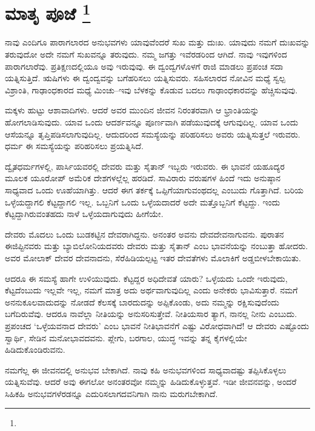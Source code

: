 
\chapter[ಮಾತೃ ಪೂಜೆ ]{ಮಾತೃ ಪೂಜೆ \protect\footnote{}}

ನಾವು ಎಂದಿಗೂ ಪಾರಾಗಲಾರದ ಅನುಭವಗಳು ಯಾವುವೆಂದರೆ ಸುಖ ಮತ್ತು ದುಃಖ. ಯಾವುದು ನಮಗೆ ದುಃಖವನ್ನು ತರುವುದೋ ಅದೇ ನಮಗೆ ಸುಖವನ್ನೂ ತರುವುದು. ನಮ್ಮ ಜಗತ್ತು ಇವೆರಡರಿಂದ ಆಗಿದೆ. ನಾವು ಇವುಗಳಿಂದ ಪಾರಾಗಲಾರೆವು. ಪ್ರತಿಕ್ಷಣದಲ್ಲಿಯೂ ಅವು ಇರುವುವು. ಈ ದ್ವಂದ್ವಗಳೊಳಗೆ ರಾಜಿ ಮಾಡಲು ಪ್ರಪಂಚ ಸದಾ ಯತ್ನಿಸುತ್ತಿದೆ. ಋಷಿಗಳು ಈ ದ್ವಂದ್ವವನ್ನು ಬಗೆಹರಿಸಲು ಯತ್ನಿಸುವರು. ಸಹಿಸಲಾರದ ನೋವಿನ ಮಧ್ಯೆ ಸ್ವಲ್ಪ ವಿಶ್ರಾಂತಿ, ಗಾಢಾಂಧಕಾರದ ಮಧ್ಯೆ ಮಿಂಚು–ಇವು ಬೆಳಕನ್ನು ಕೊಡುವ ಬದಲು ಗಾಢಾಂಧಕಾರವನ್ನು ಹೆಚ್ಚಿಸುವುವು.

ಮಕ್ಕಳು ಹುಟ್ಟು ಆಶಾವಾದಿಗಳು. ಆದರೆ ಅವರ ಮುಂದಿನ ಜೀವನ ನಿರಂತರವಾಗಿ ಆ ಭ್ರಾಂತಿಯನ್ನು ಹೋಗಲಾಡಿಸುವುದು. ಯಾವ ಒಂದು ಆದರ್ಶವನ್ನೂ ಪೂರ್ಣವಾಗಿ ಪಡೆಯುವುದಕ್ಕೆ ಆಗುವುದಿಲ್ಲ. ಯಾವ ಒಂದು ಆಸೆಯನ್ನೂ ತೃಪ್ತಿಪಡಿಸಲಾಗುವುದಿಲ್ಲ. ಆದುದರಿಂದ ಸಮಸ್ಯೆಯನ್ನು ಪರಿಹರಿಸಲು ಅವರು ಯತ್ನಿಸುತ್ತಲೆ ಇರುವರು. ಧರ್ಮ ಈ ಸಮಸ್ಯೆಯನ್ನು ಪರಿಹರಿಸಲು ಪ್ರಯತ್ನಿಸಿದೆ.

ದ್ವೈತಧರ್ಮಗಳಲ್ಲಿ, ಪಾರ್ಸಿಯವರಲ್ಲಿ ದೇವರು ಮತ್ತು ಸೈತಾನ್​ ಇಬ್ಬರು ಇರುವರು. ಈ ಭಾವನೆ ಯಹೂದ್ಯರ ಮೂಲಕ ಯೂರೋಪ್​ ಅಮೆರಿಕ ದೇಶಗಳಲ್ಲೆಲ್ಲ ಹರಡಿದೆ. ಸಾವಿರಾರು ವರುಷಗಳ ಹಿಂದೆ ಇದು ಅನುಷ್ಠಾನ ಸಾಧ್ಯವಾದ ಒಂದು ಊಹೆಯಾಗಿತ್ತು. ಆದರೆ ಈಗ ತರ್ಕಕ್ಕೆ ಒಪ್ಪಿಗೆಯಾಗುವಂಥದಲ್ಲ ಎಂಬುದು ಗೊತ್ತಾಗಿದೆ. ಬರಿಯ ಒಳ್ಳೆಯದ್ದಾಗಲಿ ಕೆಟ್ಟದ್ದಾಗಲಿ ಇಲ್ಲ. ಒಬ್ಬನಿಗೆ ಒಂದು ಒಳ್ಳೆಯದಾದರೆ ಅದೇ ಮತ್ತೊಬ್ಬನಿಗೆ ಕೆಟ್ಟದ್ದು. ಇಂದು ಕೆಟ್ಟದ್ದಾಗಿರುವಂತಹದು ನಾಳೆ ಒಳ್ಳೆಯದಾಗುವುದು ಹೀಗೆಯೇ.

ದೇವರು ಮೊದಲು ಒಂದು ಬುಡಕಟ್ಟಿನ ದೇವರಾಗಿದ್ದನು. ಅನಂತರ ಅವನು ದೇವ\-ದೇವನಾಗುವನು. ಪುರಾತನ ಈಜಿಪ್ಟಿನವರು ಮತ್ತು ಬ್ಯಾಬಿಲೋನಿಯದವರು ದೇವರು ಮತ್ತು ಸೈತಾನ್​ ಎಂಬ ಭಾವನೆಯನ್ನು ನಂಬುತ್ತಾ ಹೋದರು. ಅವರ ಮೋಲಾಕ್​ ದೇವರ ದೇವನಾದನು, ಸೆರೆಹಿಡಿಯಲ್ಪಟ್ಟ ಇತರ ದೇವತೆಗಳು ಮೊಲಾಕಿಗೆ ಅಡ್ಡಬೀಳಬೇಕಾಯಿತು.

ಆದರೂ ಈ ಸಮಸ್ಯೆ ಹಾಗೇ ಉಳಿಯುವುದು. ಕೆಟ್ಟದ್ದರ ಅಧಿದೇವತೆ ಯಾರು? ಒಳ್ಳೆಯದು ಒಂದೇ ಇರುವುದು, ಕೆಟ್ಟದೆಂಬುದು ಇಲ್ಲವೇ ಇಲ್ಲ, ನಮಗೆ ಮಾತ್ರ ಅದು ಅರ್ಥವಾಗುವುದಿಲ್ಲ ಎಂದು ಅನೇಕರು ಭಾವಿಸುತ್ತಾರೆ. ನಮಗೆ ಅನನುಕೂಲವಾದುದನ್ನು ನೋಡದೆ ಕೆಲಸಕ್ಕೆ ಬಾರದುದನ್ನು ಅಪ್ಪಿಕೊಂಡು, ಅದು ನಮ್ಮನ್ನು ರಕ್ಷಿಸುವುದೆಂದು ಬಗೆದಿರುವೆವು. ಆದರೂ ನಾವೆಲ್ಲಾ ನೀತಿಯನ್ನು ಅನುಸರಿಸುತ್ತೇವೆ. ನೀತಿಯಸಾರ ತ್ಯಾಗ, ನಾನಲ್ಲ ನೀನು ಎಂಬುದು. ಪ್ರಪಂಚದ ‘ಒಳ್ಳೆಯವನಾದ ದೇವರು’ ಎಂಬ ಭಾವನೆ ನೀತಿಭಾವನೆಗೆ ಎಷ್ಟು ವಿರೋಧವಾಗಿದೆ! ಆ ದೇವರು ಎಷ್ಟೊಂದು ಸ್ವಾರ್ಥಿ, ಸೇಡಿನ ಮನೋಭಾವದವನು. ಪ್ಲೇಗು, ಬರಗಾಲ, ಯುದ್ಧ ಇವನ್ನು ತನ್ನ ಕೈಗಳಲ್ಲಿಯೇ ಹಿಡಿದುಕೊಂಡಿರುವನು.

ನಮಗೆಲ್ಲ ಈ ಜೀವನದಲ್ಲಿ ಅನುಭವ ಬೇಕಾಗಿದೆ. ನಾವು ಕಹಿ ಅನುಭವಗಳಿಂದ ಸಾಧ್ಯವಾದಷ್ಟು ತಪ್ಪಿಸಿಕೊಳ್ಳಲು ಯತ್ನಿಸುವೆವು. ಆದರೆ ಅವು ಈಗಲೋ ಅನಂತರವೋ ನಮ್ಮನ್ನು ಹಿಡಿದುಕೊಳ್ಳುತ್ತವೆ. ಇಡೀ ಜೀವನವನ್ನು, ಅಂದರೆ ಸಿಹಿಕಹಿ ಅನುಭವಗಳೆರಡನ್ನೂ ಎದುರಿಸಲಾಗದವನಿಗಾಗಿ ನಾನು ಮರುಗಬೇಕಾಗಿದೆ.

\eject

